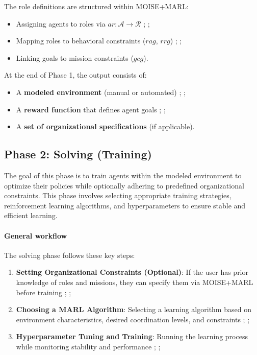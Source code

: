 \documentclass[pdflatex,sn-mathphys-num]{sn-jnl}%
\theoremstyle{thmstyleone}%
\theoremstyle{thmstyletwo}%
\theoremstyle{thmstylethree}%
\begin{document}
The role definitions are structured within MOISE+MARL:
\begin{itemize}
    \item Assigning agents to roles via $ar: \mathcal{A} \to \mathcal{R}$ ; ;
    \item Mapping roles to behavioral constraints ($rag$, $rrg$) ; ;
    \item Linking goals to mission constraints ($gcg$).
\end{itemize}

At the end of Phase 1, the output consists of:
\begin{itemize}
    \item A \textbf{modeled environment} (manual or automated) ; ;
    \item A \textbf{reward function} that defines agent goals ; ;
    \item A \textbf{set of organizational specifications} (if applicable).
\end{itemize}


\subsection{Phase 2: Solving (Training)}

The goal of this phase is to train agents within the modeled environment to optimize their policies while optionally adhering to predefined organizational constraints. This phase involves selecting appropriate training strategies, reinforcement learning algorithms, and hyperparameters to ensure stable and efficient learning.

\paragraph{\textbf{General workflow}}
The solving phase follows these key steps:
\begin{enumerate}
    \item \textbf{Setting Organizational Constraints (Optional)}: If the user has prior knowledge of roles and missions, they can specify them via MOISE+MARL before training ; ;
    \item \textbf{Choosing a MARL Algorithm}: Selecting a learning algorithm based on environment characteristics, desired coordination levels, and constraints ; ;
    \item \textbf{Hyperparameter Tuning and Training}: Running the learning process while monitoring stability and performance ; ;
\end{enumerate}
\end{document}
